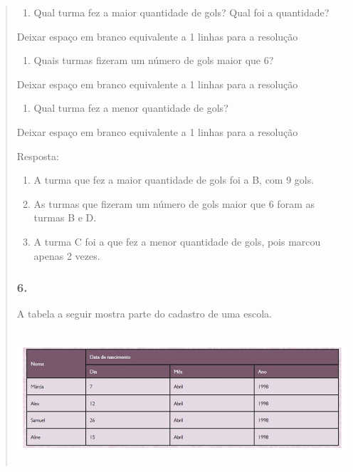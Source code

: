 \begin{enumerate}
\begin{escolha}
\begin{enumerate}
\begin{itemize}
\begin{itemize}
\begin{escolha}
\begin{quote}
\begin{escolha}
{\begin{enumerate}
\def\labelenumi{\alph{enumi})}
\item
  Qual turma fez a maior quantidade de gols? Qual foi a quantidade?
\end{enumerate}

Deixar espaço em branco equivalente a 1 linhas para a resolução

\begin{enumerate}
\def\labelenumi{\alph{enumi})}
\item
  Quais turmas fizeram um número de gols maior que 6?
\end{enumerate}

Deixar espaço em branco equivalente a 1 linhas para a resolução

\begin{enumerate}
\def\labelenumi{\alph{enumi})}
\item
  Qual turma fez a menor quantidade de gols?
\end{enumerate}

Deixar espaço em branco equivalente a 1 linhas para a resolução

Resposta:

\begin{enumerate}
\def\labelenumi{\alph{enumi})}
\item
  A turma que fez a maior quantidade de gols foi a B, com 9 gols.
\item
  As turmas que fizeram um número de gols maior que 6 foram as turmas B
  e D.
\item
  A turma C foi a que fez a menor quantidade de gols, pois marcou apenas
  2 vezes.
\end{enumerate}

\subsubsection{6.}\label{section-96}

A tabela a seguir mostra parte do cadastro de uma escola.

\includegraphics[width=5.90556in,height=1.93264in]{media/image98.png}

}
\end{escolha}
\end{quote}
\end{escolha}
\end{itemize}
\end{itemize}
\end{enumerate}
\end{escolha}
\end{enumerate}
